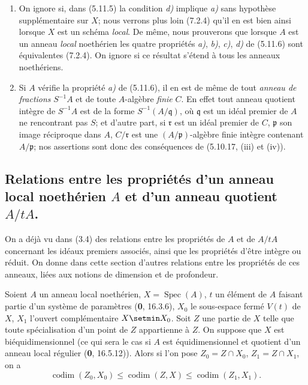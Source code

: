 \begin{remarks}[5.11.7]
\label{IV.2.s5.11.7-fr}
\begin{enumerate}
\item[(i)] On ignore si, dans (5.11.5) la condition \emph{d)} implique \emph{a)} sans
hypothèse supplémentaire sur $X$; nous verrons plus loin (7.2.4) qu'il en est
bien ainsi lorsque $X$ est un schéma \emph{local}. De même, nous prouverons que
lorsque $A$ est un anneau \emph{local} noethérien les quatre propriétés \emph{a)}, \emph{b)}, \emph{c)},
\emph{d)} de (5.11.6) sont équivalentes (7.2.4). On ignore si ce résultat s'étend à
tous les anneaux noethériens.
\item[(ii)] Si $A$ vérifie la propriété \emph{a)} de (5.11.6), il en est de même de
tout \emph{anneau de fractions} $S^{-1}A$ et de toute $A$-algèbre \emph{finie} $C$. En effet
tout anneau quotient intègre de $S^{-1}A$ est de la forme
$S^{-1}(A/\mathfrak q)$, où $\mathfrak q$ est un idéal premier de $A$ ne
rencontrant pas $S$; et d'autre part, si $\mathfrak r$ est un idéal premier de
$C$, $\mathfrak p$ son image réciproque dans $A$, $C/\mathfrak r$ est une
$(A/\mathfrak p)$-algèbre finie intègre contenant $A/\mathfrak p$; nos
assertions sont donc des conséquences de (5.10.17, (iii) et (iv)).
\end{enumerate}
\end{remarks}

\subsection{\texorpdfstring{Relations entre les propriétés d'un anneau local noethérien $A$ et
d'un anneau quotient $A/tA$.}{Relations entre les propriétés d'un anneau local noethérien A et d'un anneau quotient A/tA}}

On a déjà vu dans (3.4) des relations entre les propriétés de $A$ et de $A/tA$
concernant les idéaux premiers associés, ainsi que les propriétés d'être
intègre ou réduit. On donne dans cette section d'autres relations entre les
propriétés de ces anneaux, liées aux notions de dimension et de profondeur.

\begin{proposition}[5.12.1]
\label{IV.2.s5.12.1-fr}
Soient $A$ un anneau local noethérien, $X=\operatorname{Spec}(A)$, $t$ un
élément de $A$ faisant partie d'un système de paramètres \textup{(\textbf{0}, 16.3.6)}, $X_0$ le
sous-espace fermé $V(t)$ de $X$, $X_1$ l'ouvert complémentaire $X\setmin X_0$. Soit
$Z$ une partie de $X$ telle que toute spécialisation d'un point de $Z$
appartienne à $Z$. On suppose que $X$ est biéquidimensionnel \textup{(ce qui sera le
cas si $A$ est équidimensionnel et quotient d'un anneau local régulier (\textbf{0},
16.5.12))}. Alors si l'on pose $Z_0=Z\cap X_0$, $Z_1=Z\cap X_1$, on a
\begin{equation}
\operatorname{codim}(Z_0,X_0)\leq\operatorname{codim}(Z,X)
\leq\operatorname{codim}(Z_1,X_1).
\tag{5.12.1.1}\label{IV.2.s5.12.1.1-fr}
\end{equation}
\end{proposition}


